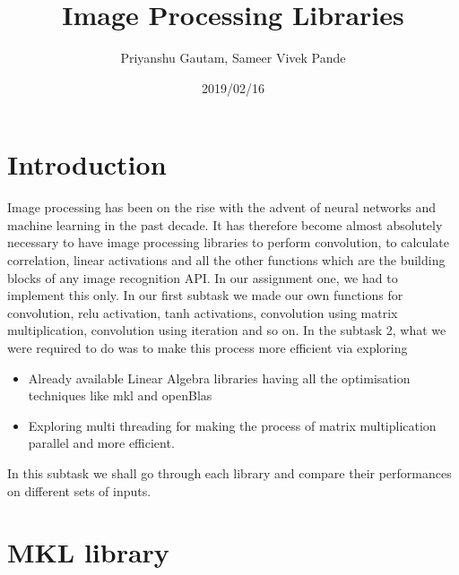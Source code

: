 \documentclass[a4paper]{article}
\title{Image Processing Libraries}
\author{Priyanshu Gautam, Sameer Vivek Pande}
\date{2019/02/16}
\begin{document}
\maketitle

\section{Introduction}

Image processing has been on the rise with the advent of neural networks and machine learning in the past decade. It has therefore become almost absolutely necessary to have image processing libraries to perform convolution, to calculate correlation, linear activations and all the other functions which are the building blocks of any image recognition API. 
In our assignment one, we had to implement this only. In our first subtask we made our own functions for convolution, relu activation, tanh activations, convolution using matrix multiplication, convolution using iteration and so on. In the subtask 2, what we were required to do was to make this process more efficient via exploring \begin{itemize}
\item Already available Linear Algebra libraries having all the optimisation techniques like mkl and openBlas
\item Exploring multi threading for making the process of matrix multiplication parallel and more efficient.
\end {itemize}

In this subtask we shall go through each library and compare their performances on different sets of inputs.



\section{MKL library}
\end{document}
